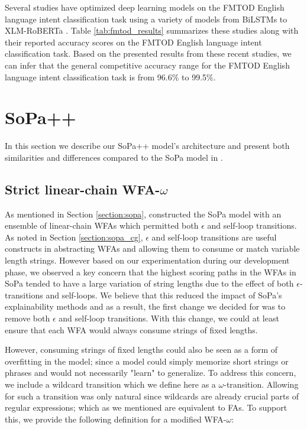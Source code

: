 Several studies have optimized deep learning models on the FMTOD English
language intent classification task using a variety of models from BiLSTMs to
XLM-RoBERTa
\citep{schuster-etal-2019-cross-lingual,zhang2019joint,zhang-etal-2020-intent}.
Table \ref{tab:fmtod_results} summarizes these studies along with their reported
accuracy scores on the FMTOD English language intent classification task. Based
on the presented results from these recent studies, we can infer that the
general competitive accuracy range for the FMTOD English language intent
classification task is from 96.6$\%$ to 99.5$\%$.

\section{SoPa++}

In this section we describe our SoPa++ model's architecture and present both
similarities and differences compared to the SoPa model in
\citet{schwartz2018sopa}.

\subsection{Strict linear-chain WFA-$\omega$}

As mentioned in Section \ref{section:sopa}, \citet{schwartz2018sopa}
constructed the SoPa model with an ensemble of linear-chain WFAs which permitted
both $\epsilon$ and self-loop transitions. As noted in Section
\ref{section:sopa_cg}, $\epsilon$ and self-loop transitions are useful
constructs in abstracting WFAs and allowing them to consume or match variable length
strings. However based on our experimentation during our development phase, we
observed a key concern that the highest scoring paths in the WFAs in SoPa tended
to have a large variation of string lengths due to the effect of both
$\epsilon$-transitions and self-loops. We believe that this reduced the impact of
SoPa's explainability methods and as a result, the first change we decided for
was to remove both $\epsilon$ and self-loop transitions. With this change, we could
at least ensure that each WFA would always consume strings of fixed lengths.

However, consuming strings of fixed lengths could also be seen as a form of
overfitting in the model; since a model could simply memorize short strings or
phrases and would not necessarily "learn" to generalize. To address this
concern, we include a wildcard transition which we define here as a
$\omega$-transition. Allowing for such a transition was only natural since
wildcards are already crucial parts of regular expressions; which as we
mentioned are equivalent to FAs. To support this, we provide the following
definition for a modified WFA-$\omega$:

